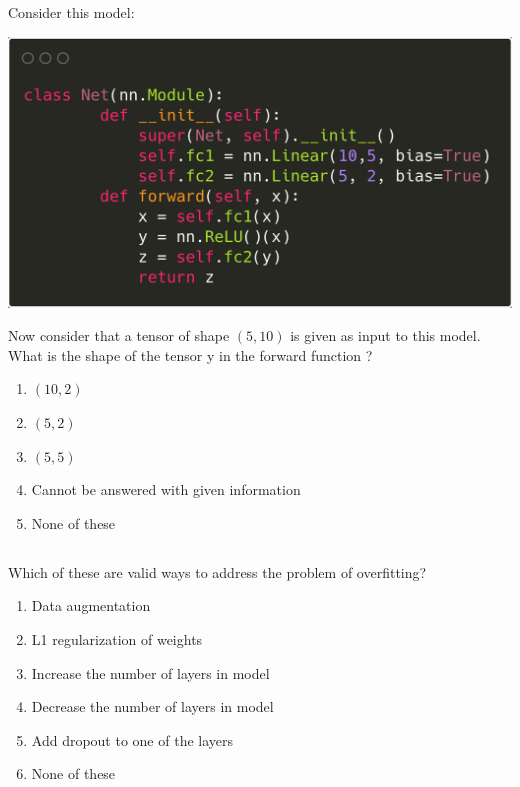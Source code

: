 \begin{frame}
\section{}
Consider this model:

\includegraphics[scale=0.1]{images/q33_3.png}

Now consider that a tensor of shape $(5,10)$ is given as input to this model. What is the shape of the tensor y in the forward function ?
\begin{enumerate}[label=(\Alph*)]
\item $(10,2)$
\item $(5,2)$
\item $(5,5)$   %
\item Cannot be answered with given information
\item None of these   %
\end{enumerate}
\end{frame}


\begin{frame}
\section{}
Which of these are valid ways to address the problem of overfitting?
\begin{enumerate}[label=(\Alph*)]
\item Data augmentation   %
\item L1 regularization of weights    %
\item Increase the number of layers in model
\item Decrease the number of layers in model    %
\item Add dropout to one of the layers    %
\item None of these  %
\end{enumerate}
\end{frame}


